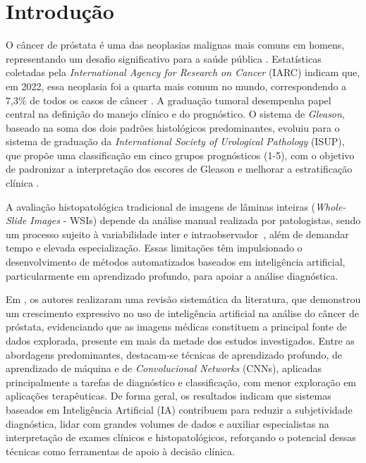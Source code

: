 \chapter{Introdução}
\label{cap:introducao}

O câncer de próstata é uma das neoplasias malignas mais comuns em homens, representando um desafio significativo para a saúde pública \cite{ref_siegel2024}. Estatísticas coletadas pela \textit{International Agency for Research on Cancer} (IARC) indicam que, em 2022, essa neoplasia foi a quarta mais comum no mundo, correspondendo a 7,3\% de todos os casos de câncer \cite{JournalStatistic2024}. A graduação tumoral desempenha papel central na definição do manejo clínico e do prognóstico. O sistema de \textit{Gleason}, baseado na soma dos dois padrões histológicos predominantes, evoluiu para o sistema de graduação da \textit{International Society of Urological Pathology} (ISUP), que propõe uma classificação em cinco grupos prognósticos (1-5), com o objetivo de padronizar a interpretação dos escores de Gleason e melhorar a estratificação clínica \cite{ref-epstein2016}.

A avaliação histopatológica tradicional de imagens de lâminas inteiras (\textit{Whole-Slide Images} - WSIs) depende da análise manual realizada por patologistas, sendo um processo sujeito à variabilidade inter e intraobservador~\cite{ref-bulten2020}, além de demandar tempo e elevada especialização. Essas limitações têm impulsionado o desenvolvimento de métodos automatizados baseados em inteligência artificial, particularmente em aprendizado profundo, para apoiar a análise diagnóstica.

Em \cite{expert2022review}, os autores realizaram uma revisão sistemática da literatura, que demonstrou um crescimento expressivo no uso de inteligência artificial na análise do câncer de próstata, evidenciando que as imagens médicas constituem a principal fonte de dados explorada, presente em mais da metade dos estudos investigados. Entre as abordagens predominantes, destacam-se técnicas de aprendizado profundo, de aprendizado de máquina e de \textit{Convolucional Networks} (CNNs), aplicadas principalmente a tarefas de diagnóstico e classificação, com menor exploração em aplicações terapêuticas. De forma geral, os resultados indicam que sistemas baseados em Inteligência Artificial (IA) contribuem para reduzir a subjetividade diagnóstica, lidar com grandes volumes de dados e auxiliar especialistas na interpretação de exames clínicos e histopatológicos, reforçando o potencial dessas técnicas como ferramentas de apoio à decisão clínica.

